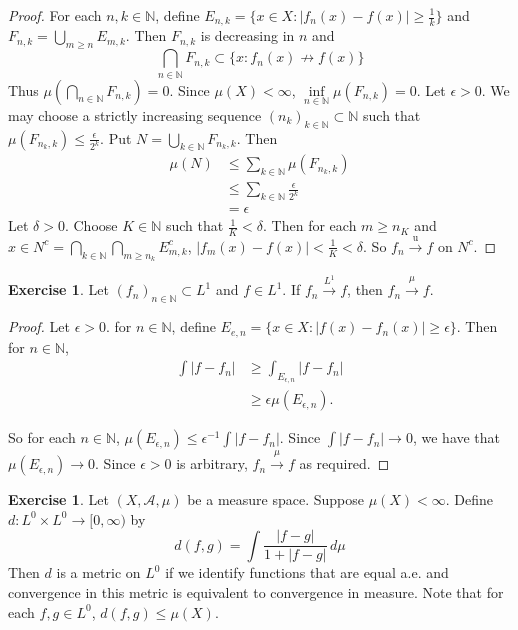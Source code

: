 \documentclass{book}
\theoremstyle{definition}
\newtheorem{ex}[definition]{Exercise}
\newcommand{\del}{\delta}
\newcommand{\ep}{\epsilon}
\newcommand{\N}{\mathbb{N}}
\newcommand{\MA}{\mathcal{A}}
\newcommand{\lex}[1]{\label{ex:#1}}
\DeclareMathOperator*{\0}{\mbf{0}}
\DeclareMathOperator*{\1}{\mbf{1}}
\newcommand{\convt}[1]{\xrightarrow{\text{#1}}}
\newcommand{\conv}[1]{\xrightarrow{#1}}
\newcommand{\Rg}{[0,\infty)}
\newcommand{\dmu}{\, d \mu}
\begin{document}
	\begin{proof}
		For each $n, k \in \N$, define $E_{n, k} = \{x \in X: | f_n(x) - f(x) | \geq \frac{1}{k} \}$ and $F_{n,k} = \bigcup\limits_{m \geq n}E_{m,k}$. Then $F_{n,k}$ is decreasing in $n$ and $$\bigcap\limits_{n \in \N}F_{n,k} \subset \{x: f_n(x) \not \rightarrow f(x)\}$$ 
		Thus $\mu(\bigcap\limits_{n \in \N}F_{n,k}) = 0$. Since $\mu(X) < \infty$, $\inf\limits_{n \in \N}\mu(F_{n,k}) = 0$. Let $\ep >0$. We may choose a strictly increasing sequence $(n_k)_{k \in \N} \subset \N$ such that  $\mu(F_{n_k,k}) \leq \frac{\ep}{2^{k}}$. Put $N = \bigcup\limits_{k \in \N}F_{n_k,k}$. Then 
		\begin{align*}
			\mu(N) 
			&\leq \sum\limits_{k \in \N}\mu(F_{n_k,k}) \\
			& \leq \sum\limits_{k \in \N} \frac{\ep}{2^k}\\
			& = \ep
		\end{align*} 
		Let $\del > 0$. Choose $K \in \N$ such that $\frac{1}{K} < \del$. Then for each $m \geq n_K$ and $x \in N^c =\bigcap\limits_{k \in \N}\bigcap\limits_{m \geq n_k}E_{m,k}^c$, $|f_m(x)- f(x)| < \frac{1}{K} < \del$. So $f_n \convt{u} f$ on $N^c$. 
	\end{proof}
	
	\begin{ex} \lex{35006} 
		Let $(f_n)_{n \in \N} \subset L^1$ and $f \in L^1$. If $f_n \xrightarrow{L^1}f$, then $f_n \conv{\mu} f$.
	\end{ex}
	
	\begin{proof}
		Let $\ep >0$. for $n \in \N$, define $E_{e,n} = \{x \in X: |f(x) - f_n(x)|\geq \ep\}$. Then for $n \in \N$,
		\begin{align*}
			\int |f - f_n|
			& \geq \int_{E_{\ep,n}} |f- f_n|\\
			& \geq \ep \mu(E_{\ep,n}).
		\end{align*}
		
		So for each $n \in \N$, $\mu(E_{\ep, n}) \leq \ep^{-1}\int |f - f_n|$. Since $\int |f - f_n| \rightarrow 0$, we have that $\mu(E_{\ep,n}) \rightarrow 0$. Since $\ep >0$ is arbitrary, $f_n \conv{\mu} f$ as required. 
	\end{proof}
	
	\begin{ex} \lex{35007} 
		Let $(X, \MA, \mu)$ be a measure space. Suppose $\mu(X) < \infty$. Define $d:L^0 \times L^0 \rightarrow \Rg$ by $$d(f,g) = \int \frac{|f-g|}{1+|f-g|} \dmu $$
		Then $d$ is a metric on $L^0$ if we identify functions that are equal a.e. and convergence in this metric is equivalent to convergence in measure. Note that for each $f,g \in L^0$, $d(f,g) \leq \mu(X)$.
	\end{ex} 
	
\end{document}
